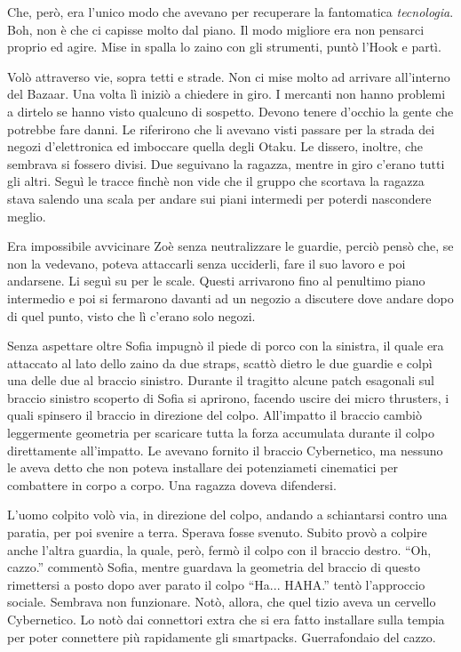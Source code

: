     Che, però, era l'unico modo che avevano per recuperare la fantomatica \emph{tecnologia}. Boh, non è che ci capisse
    molto dal piano. Il modo migliore era non pensarci proprio ed agire. Mise in spalla lo zaino con gli strumenti,
    puntò l'Hook e partì.

    Volò attraverso vie, sopra tetti e strade. Non ci mise molto ad arrivare all'interno del Bazaar. Una volta lì iniziò
    a chiedere in giro. I mercanti non hanno problemi a dirtelo se hanno visto qualcuno di sospetto. Devono tenere
    d'occhio la gente che potrebbe fare danni. Le riferirono che li avevano visti passare per la strada dei negozi
    d'elettronica ed imboccare quella degli Otaku. Le dissero, inoltre, che sembrava si fossero divisi. Due seguivano la
    ragazza, mentre in giro c'erano tutti gli altri. Seguì le tracce finchè non vide che il gruppo che scortava la
    ragazza stava salendo una scala per andare sui piani intermedi per poterdi nascondere meglio.

    Era impossibile avvicinare Zoè senza neutralizzare le guardie, perciò pensò che, se non la vedevano, poteva
    attaccarli senza ucciderli, fare il suo lavoro e poi andarsene. Li seguì su per le scale. Questi arrivarono fino al
    penultimo piano intermedio e poi si fermarono davanti ad un negozio a discutere dove andare dopo di quel punto, visto
    che lì c'erano solo negozi.

    Senza aspettare oltre Sofia impugnò il piede di porco con la sinistra, il quale era attaccato al lato dello zaino da
    due straps, scattò dietro le due guardie e colpì una delle due al braccio sinistro. Durante il tragitto alcune patch
    esagonali sul braccio sinistro scoperto di Sofia si aprirono, facendo uscire dei micro thrusters, i quali spinsero
    il braccio in direzione del colpo. All'impatto il braccio cambiò leggermente geometria per scaricare tutta la forza
    accumulata durante il colpo direttamente all'impatto. Le avevano fornito il braccio Cybernetico, ma nessuno le
    aveva detto che non poteva installare dei potenziameti cinematici per combattere in corpo a corpo. Una ragazza
    doveva difendersi.

    L'uomo colpito volò via, in direzione del colpo, andando a schiantarsi contro una paratia, per poi svenire a terra.
    Sperava fosse svenuto. Subito provò a colpire anche l'altra guardia, la quale, però, fermò il colpo con il braccio
    destro. ``Oh, cazzo.'' commentò Sofia, mentre guardava la geometria del braccio di questo rimettersi a posto dopo
    aver parato il colpo ``Ha... HAHA.'' tentò l'approccio sociale. Sembrava non funzionare. Notò, allora, che quel
    tizio aveva un cervello Cybernetico. Lo notò dai connettori extra che si era fatto installare sulla tempia per poter
    connettere più rapidamente gli smartpacks. Guerrafondaio del cazzo.


